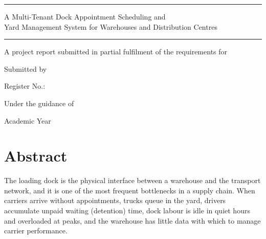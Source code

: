 \begin{titlepage}
\centering
\vspace*{-1cm}
{\large\bfseries\MakeUppercase{\Institution}\par}
{\normalsize \InstitutionPlace\par}
\vspace{0.4cm}
{\normalsize \Department\par}
\vspace{1.2cm}
{\color{brand}\rule{0.8\textwidth}{1.2pt}\par}
\vspace{0.5cm}
{\LARGE\bfseries\color{ink}\ProjectShortTitle\par}
\vspace{0.3cm}
{\large\color{ink}A Multi-Tenant Dock Appointment Scheduling and\\ Yard Management System for Warehouses and Distribution Centres\par}
\vspace{0.5cm}
{\color{brand}\rule{0.8\textwidth}{1.2pt}\par}
\vspace{1cm}
{\normalsize A project report submitted in partial fulfilment of the requirements for\par}
{\normalsize \Course\par}
\vspace{0.3cm}
{\normalsize \Programme\par}
\vspace{1.4cm}
{\normalsize Submitted by\par}
\vspace{0.2cm}
{\large\bfseries \StudentName\par}
{\normalsize Register No.: \RegisterNumber\par}
\vspace{1cm}
{\normalsize Under the guidance of\par}
\vspace{0.2cm}
{\large\bfseries \GuideName\par}
\vfill
{\normalsize Academic Year \AcademicYear\par}
{\normalsize \SubmissionMonth\par}
\end{titlepage}

\chapter*{Abstract}
The loading dock is the physical interface between a warehouse and the transport network, and it is one of the most frequent bottlenecks in a supply chain. When carriers arrive without appointments, trucks queue in the yard, drivers accumulate unpaid waiting (detention) time, dock labour is idle in quiet hours and overloaded at peaks, and the warehouse has little data with which to manage carrier performance.

